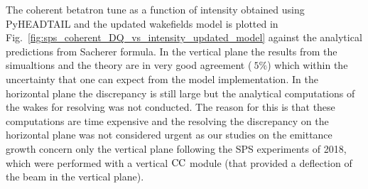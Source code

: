 The coherent betatron tune as a function of intensity obtained using PyHEADTAIL and the updated wakefields model is plotted in Fig.~\ref{fig:sps_coherent_DQ_vs_intensity_updated_model} against the analytical predictions from Sacherer formula. In the vertical plane the results from the simualtions and the theory are in very good agreement ($~5\%$) which within the uncertainty that one can expect from the model implementation. In the horizontal plane the discrepancy is still large but the analytical computations of the wakes for resolving was not conducted. The reason for this is that these computations are time expensive and the resolving the discrepancy on the horizontal plane was not considered urgent as our studies on the emittance growth concern only the vertical plane following the SPS experiments of 2018, which were performed with a vertical ${\mathrm{CC}}$ module (that provided a deflection of the beam in the vertical plane).

